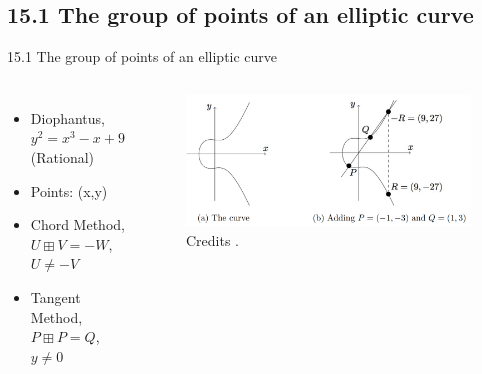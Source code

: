 \documentclass[aspectratio=169,xcolor=dvipsnames]{beamer}
\begin{document}
\subsection{15.1 The group of points of an elliptic curve}
    \begin{frame}{15.1 The group of points of an elliptic curve}

    \begin{columns}[c] %

        \begin{itemize}
            \item Diophantus, $y^2 = x^3 - x + 9$ (Rational)
            \item Points: (x,y)
            \item Chord Method, $U \boxplus V = - W$, $U \neq -V$
            \item Tangent Method, $P \boxplus P = Q$, $y \neq 0$
        \end{itemize}


    \begin{figure}
        \includegraphics[width=1\linewidth]{Figure15.1.png}
    \caption{Credits \cite{p1}.}
    \end{figure}
    \end{columns}

\end{frame}
\end{document}
